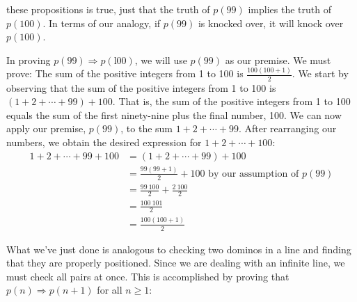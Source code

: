 \documentclass[10pt,]{book}
\theoremstyle{plain}
\theoremstyle{definition}
\theoremstyle{definition}
\theoremstyle{definition}
\theoremstyle{definition}
\begin{document}
these propositions is true, just that the truth of \(p(99)\) implies the truth of \(p(100)\). In terms of our analogy, if \(p(99)\) is knocked over, it will knock over \(p(100)\).%
\par
In proving \(p(99) \Rightarrow  p(\text{l00})\), we will use \(p(99)\) as our premise. We must prove: The sum of the positive integers from 1 to 100 is \(\frac{100 (100+1)}{2}\). We start by observing that the sum of the positive integers from 1 to 100 is \((1 + 2 + \cdots  + 99) +100\). That is, the sum of the positive integers from 1 to 100 equals  the sum of the first ninety-nine plus the final number, 100. We can now apply our premise, \(p(99)\), to the sum \(1 + 2 + \cdots  + 99\). After rearranging our numbers, we obtain the desired expression for \(1 + 2 + \cdots  + 100\):
\begin{equation*}\begin{split}
 1 + 2 + \cdots  + 99 + 100 & = (1 + 2 + \cdots + 99) + 100 \\ 
 & = \frac{99 (99+1)}{2}+ 100 \textrm{         by our assumption of } p(99)\\
 & = \frac{99\ 100}{2} + \frac{2\ 100}{2} \\
 & =  \frac{100\ 101}{2}  \\
 & = \frac{100 (100+1)}{2} 
\end{split}
\end{equation*}%
\par
What we've just done is analogous to checking two dominos in a line and finding that they are properly positioned. Since we are dealing with an infinite line, we must check all pairs at once. This is accomplished by proving that \(p(n) \Rightarrow  p(n + 1)\) for all \(n \geq  1\):
\end{document}
